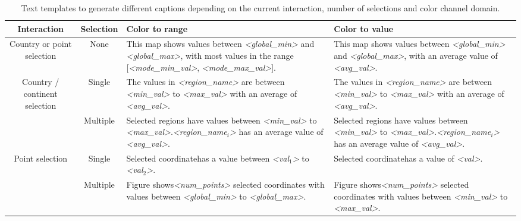 \figAppCaption

\begin{table}[!ht]
\centering
\begin{tabular}{|c|c|p{4.5cm}|p{4.5cm}|}
\hline
\textbf{Interaction} & \textbf{Selection} & \textbf{Color to range} & \textbf{Color to value} \\
\hline
\multirow{1}{2cm}{Country or point selection} & None & This map shows values between \textit{<global\_min>} and \textit{<global\_max>}, with most values in the range [\textit{<mode\_min\_val>}, \textit{<mode\_max\_val>}]. & This map shows values between \textit{<global\_min>} and \textit{<global\_max>}, with an average value of \textit{<avg\_val>}. \\
\hline
\multirow{2}{2cm}{Country / continent selection} & Single & The values in \textit{<region\_name>} are between \textit{<min\_val>} to \textit{<max\_val>} with an average of \textit{<avg\_val>}. & The values in \textit{<region\_name>} are between \textit{<min\_val>} to \textit{<max\_val>} with an average of \textit{<avg\_val>}. \\
\cline{2-4}
 & Multiple & Selected regions have values between \textit{<min\_val>} to \textit{<max\_val>}.\newline \textit{<region\_name$_i$>} has an average value of \textit{<avg\_val>}. & Selected regions have values between \textit{<min\_val>} to \textit{<max\_val>}.\newline \textit{<region\_name$_i$>} has an average value of \textit{<avg\_val>}. \\
\hline
\multirow{2}{2cm}{Point selection} & Single & Selected coordinate has a value between \textit{<val$_1$>} to \textit{<val$_2$>}. & Selected coordinate has a value of \textit{<val>}. \\
\cline{2-4}
 & Multiple & Figure shows\newline \textit{<num\_points>} selected coordinates with values between \textit{<global\_min>} to \textit{<global\_max>}. & Figure shows\newline \textit{<num\_points>} selected coordinates with values between \textit{<min\_val>} to \textit{<max\_val>}. \\
\hline
\end{tabular}
\caption[Text templates to generate different captions.]{Text templates to generate different captions depending on the current interaction, number of selections and color channel domain.}
\label{tab:textTemplates}
\end{table}

